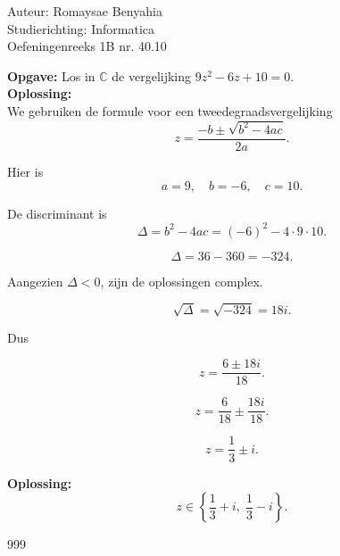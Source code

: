 \documentclass[a4paper]{article}
\begin{document}
\noindent \large Auteur: Romaysae Benyahia \\ 
\noindent \large Studierichting: Informatica\\
\noindent \large Oefeningenreeks 1B nr. 40.10\\ 

\medskip

\normalsize

\textbf{Opgave: } Los in $\mathbb{C}$ de vergelijking $9z^2 - 6z + 10 = 0$. \\

\textbf{Oplossing: } \\

We gebruiken de formule voor een tweedegraadsvergelijking
\[
z = \frac{-b \pm \sqrt{b^2 - 4ac}}{2a}.
\]

Hier is
\[
a = 9, \quad b = -6, \quad c = 10.
\]

De discriminant is
\[
\Delta = b^2 - 4ac = (-6)^2 - 4\cdot 9 \cdot 10.
\]

\[
\Delta = 36 - 360 = -324.
\]

Aangezien $\Delta < 0$, zijn de oplossingen complex.

\[
\sqrt{\Delta} = \sqrt{-324} = 18i.
\]

Dus

\[
z = \frac{6 \pm 18i}{18}.
\]

\[
z = \frac{6}{18} \pm \frac{18i}{18}.
\]

\[
z = \frac{1}{3} \pm i.
\]

\textbf{Oplossing: } 
\[
z \in \left\{ \frac{1}{3} + i,\; \frac{1}{3} - i \right\}.
\]

\begin{thebibliography}{999}
\end{thebibliography}
\end{document}
